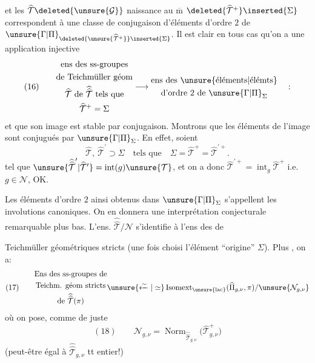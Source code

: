 

et les $\widehat{\mathcal{T}}\deleted{\unsure{\mathcal G}}$  naissance au $\overline{\mathrm m}$ $\deleted{\widehat{\mathcal{T}}^{+}}\inserted{\Sigma}$ correspondent  à une classe de conjugaison d'éléments d'ordre $2$ de $\unsure{\Gamma|\Pi}_{\deleted{\unsure{\widehat{\mathcal{T}}^{+}}}\inserted{\Sigma}}$. Il est clair  en tous cas qu'on a une application injective
\[
(16)\qquad
\begin{gathered}
\text{ens des ss-groupes}\\
\text{de Teichmüller géom}\\
\widehat{\mathcal{T}}\text{ de }\widehat{\widehat{\mathcal{T}}}\text{ tels que}\\
\widehat{\mathcal{T}}^{+}=\Sigma
\end{gathered}
\longrightarrow
\begin{gathered}
\text{ens des }\unsure{\text{éléments}|\text{élémts}}\\
\text{d'ordre }2\text{ de }\unsure{\Gamma|\Pi}_{\Sigma}
\end{gathered}
\quad :
\]
et que son image est stable par conjugaison. Montrons que les éléments de l'image sont conjugués par $\unsure{\Gamma|\Pi}_{\Sigma}$. En effet, soient
\[
\widehat{\mathcal{T}},\ \widehat{\mathcal{T}}^{\prime}\supset\Sigma
\quad\text{tels que}\quad
\Sigma=\widehat{\mathcal{T}}^{+}=\widehat{\mathcal{T}}^{\prime+}.
\]
tel que
$\unsure{\widehat{\widehat{\mathcal{T}}}^{\prime}|\widehat{\mathcal{T}}^{\prime}}=\operatorname{int}(g)\unsure{\mathcal{T}}$,
et on a donc
$\widehat{\mathcal{T}}^{\prime+}=\operatorname{int}_{g}\widehat{\mathcal{T}}^{+}$
i.e. $g\in\mathcal{N}$, OK.

Les éléments d'ordre $2$ ainsi obtenus dans $\unsure{\Gamma|\Pi}_{\Sigma}$ s'appellent les involutions canoniques. On en donnera une interprétation conjecturale remarquable plus bas. L'ens. $\widehat{\widehat{\mathcal{T}}}/\mathcal{N}$ s'identifie à l'ens des  de



Teichmüller géométriques stricts (une fois choisi l'élément ``origine'' $\Sigma$). Plus , on a:
\[
(17)\qquad
\begin{gathered}
\text{Ens des ss-groupes de}\\
\text{Teichm. géom stricts}\\
\text{de }\widehat{\widehat{\mathcal{T}}}(\pi)
\end{gathered}
\unsure{\xleftarrow{\sim}|\simeq}
\operatorname{Isomext}_{\unsure{\mathrm{lac}}}
(\widehat{\Pi}_{g,\nu},\pi)/\unsure{\mathcal{N}_{g,\nu}} 
\]
où on pose, comme de juste
\[
(18)\qquad
\mathcal{N}_{g,\nu}
=\operatorname{Norm}_{\widehat{\widehat{\mathcal{T}}}_{g,\nu}}
\bigl(\widehat{\mathcal{T}}_{g,\nu}^{+}\bigr)
\]
(peut-être égal à $\widehat{\widehat{\mathcal{T}}}_{g,\nu}$ tt entier!)


